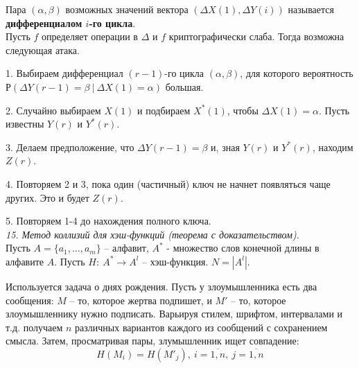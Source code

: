 Пара $(\alpha, \beta)$ возможных значений вектора $(\Delta X(1), \Delta Y(i))$ называется \textbf{дифференциалом $i$-го цикла}. \\

\noindent Пусть $f$ определяет операции в $\Delta$ и $f$ криптографически слаба. Тогда возможна следующая атака.

1. Выбираем дифференциал $(r-1)$-го цикла $(\alpha, \beta)$, для которого вероятность $Р(\Delta Y(r-1) = \beta\ |\ \Delta X(1) = \alpha)$ большая.

2. Случайно выбираем $X(1)$ и подбираем $X^* (1)$, чтобы
$\Delta X(1) = \alpha$. Пусть известны $Y(r)$ и $Y^* (r)$.

3. Делаем предположение, что $\Delta Y(r-1) = \beta$ и, зная $Y(r)$ и $Y^* (r)$, находим $Z(r)$.

4. Повторяем 2 и 3, пока один (частичный) ключ не начнет
появляться чаще других. Это и будет $Z(r)$.

5. Повторяем 1-4 до нахождения полного ключа. \\

\noindent \textit{15. Метод коллизий для хэш-функций (теорема с доказательством).} \\

Пусть $A = \{a_1, \ldots, a_m \}$ -- алфавит, $A^*$ - множество слов конечной длины в алфавите $A$. Пусть $H:\ A^* \rightarrow A^l$ -- хэш-функция. $N = |A^l|$.

Используется задача о днях рождения. Пусть у злоумышленника есть два сообщения: $M$ -- то, которое жертва подпишет, и $M'$ -- то, которое злоумышленнику нужно подписать. Варьируя стилем, шрифтом, интервалами и т.д. получаем $n$ различных вариантов каждого из сообщений с сохранением смысла. Затем, просматривая пары, злумышленник ищет совпадение:
$$H(M_i) = H(M'_j),\ i = \overline{1, n},\ j = \overline{1, n}$$

